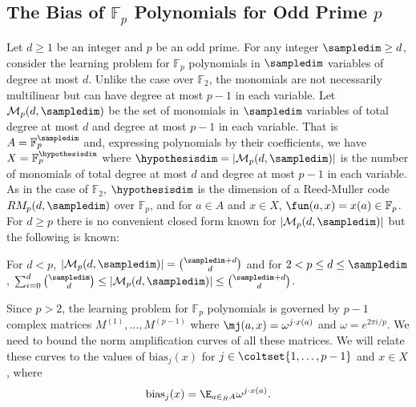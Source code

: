 \newcommand{\val}{\textrm{val}}
\newcommand{\monomial}[3]{\mathcal{M}_{#1}(#2,#3)}
\newcommand{\mjs}{M^{(j^*)}}
\newcommand{\biasj}{\mathrm{bias}_j}
\newcommand{\biasjs}{\mathrm{bias}_{j^*}}




\subsection{The Bias of $\mathbb{F}_p$ Polynomials for Odd Prime $p$}
\label{sec:complex-quadratic}

Let $d\ge 1$ be an integer and $p$ be an odd prime.
For any integer $\sampledim\ge d$, consider the learning
problem for $\mathbb{F}_p$ polynomials in $\sampledim$ variables of degree at most $d$.
Unlike the case over $\mathbb{F}_2$, the monomials are not necessarily
multilinear but can have degree at most $p-1$ in each variable.
Let $\monomial{p}{d}{\sampledim}$ be the set of monomials in $\sampledim$ variables of
total degree at most $d$ and degree at most $p-1$ in each
variable.
That is $A=\mathbb{F}_p^\sampledim$ and, expressing polynomials by their coefficients,
we have $X=\mathbb{F}_p^\hypothesisdim$ where $\hypothesisdim=|\monomial{p}{d}{\sampledim}|$ is the number of
monomials of total degree at most $d$ and degree at most $p-1$ in each
variable.
As in the case of $\mathbb{F}_2$, $\hypothesisdim$ is the dimension of a Reed-Muller code
$RM_p(d,\sampledim)$ over $\mathbb{F}_p$, 
and for $a\in A$ and $x\in X$,
$\fun (a,x)=x(a)\in \mathbb{F}_p$.
For $d\ge p$ there is no convenient closed form known for $|\monomial{p}{d}{\sampledim}|$
but the following is known:

\begin{proposition}
For $d<p$, $|\monomial{p}{d}{\sampledim}|=\binom{\sampledim+d}{d}$ and
for $2<p\le d\le \sampledim$,
$\sum_{i=0}^d \binom{\sampledim}{d}\le |\monomial{p}{d}{\sampledim}|\le \binom{\sampledim+d}{d}$.
\end{proposition}

\begin{sloppypar}
Since $p>2$, the learning problem for $\mathbb{F}_p$ polynomials is governed
by $p-1$ complex matrices $M^{(1)},\ldots,M^{(p-1)}$ where
$\mj(a,x)=\omega^{j\cdot x(a)}$ and $\omega=e^{2\pi i/p}$.   
We need to bound the norm amplification curves of all these matrices.
We will relate these curves to the values of $\biasj(x)$ for $j\in \coltset{1,\ldots,p-1}$ and $x\in X$, where
$$\biasj(x)=\E_{a\in_R A} \omega^{j\cdot x(a)}.$$
\end{sloppypar}

